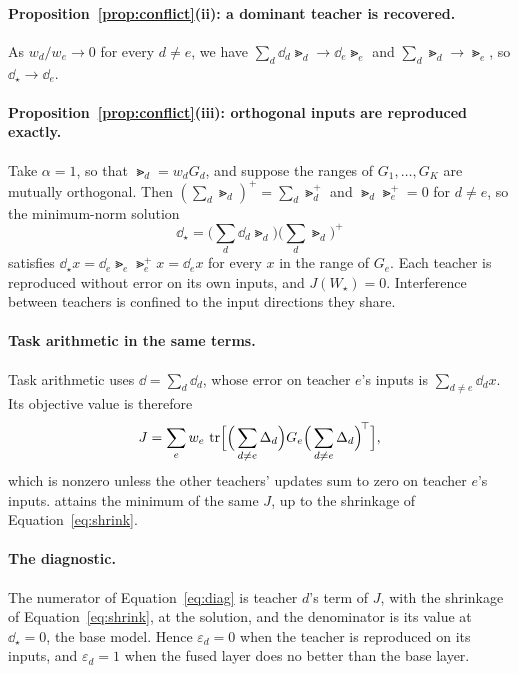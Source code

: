 \paragraph{Proposition~\ref{prop:conflict}(ii): a dominant teacher is
recovered.} As $w_d/w_e\to0$ for every $d\ne e$, we have
$\sum_d\dd_d\Gt_d\to\dd_e\Gt_e$ and $\sum_d\Gt_d\to\Gt_e$, so
$\dd_\star\to\dd_e$.

\paragraph{Proposition~\ref{prop:conflict}(iii): orthogonal inputs are
reproduced exactly.} Take $\alpha=1$, so that $\Gt_d=w_dG_d$, and suppose the
ranges of $G_1,\dots,G_K$ are mutually orthogonal. Then
$(\sum_d\Gt_d)^{+}=\sum_d\Gt_d^{+}$ and $\Gt_d\Gt_e^{+}=0$ for $d\ne e$, so the
minimum-norm solution
\begin{equation*}
\dd_\star=\Big(\sum_d\dd_d\Gt_d\Big)\Big(\sum_d\Gt_d\Big)^{+}
\end{equation*}
satisfies $\dd_\star x=\dd_e\Gt_e\Gt_e^{+}x=\dd_ex$ for every $x$ in the range of
$G_e$. Each teacher is reproduced without error on its own inputs, and
$J(W_\star)=0$. Interference between teachers is confined to the input
directions they share.

\paragraph{Task arithmetic in the same terms.} Task arithmetic uses
$\dd=\sum_d\dd_d$, whose error on teacher $e$'s inputs is
$\sum_{d\ne e}\dd_dx$. Its objective value is therefore
\begin{equation*}
J=\sum_ew_e\,\operatorname{tr}\!\Big[\Big(\sum_{d\ne e}\Delta_d\Big)G_e\Big(\sum_{d\ne e}\Delta_d\Big)^{\!\top}\Big],
\end{equation*}
which is nonzero unless the other teachers' updates sum to zero on teacher
$e$'s inputs. \method attains the minimum of the same $J$, up to the shrinkage
of Equation~\eqref{eq:shrink}.

\paragraph{The diagnostic.} The numerator of Equation~\eqref{eq:diag} is
teacher $d$'s term of $J$, with the shrinkage of Equation~\eqref{eq:shrink},
at the solution, and the denominator is its value at $\dd_\star=0$, the base
model. Hence $\varepsilon_d=0$ when the teacher is reproduced on its inputs,
and $\varepsilon_d=1$ when the fused layer does no better than the base layer.

